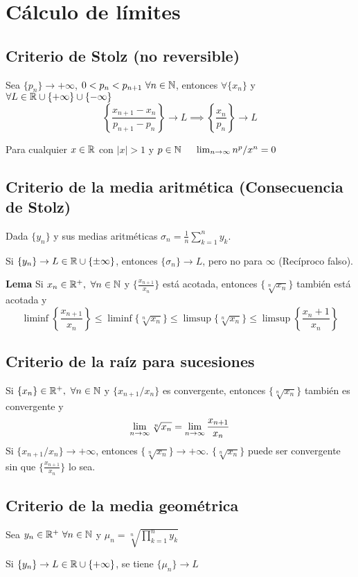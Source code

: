 \section{Cálculo de límites}
\subsection{Criterio de Stolz (no reversible)}
Sea $\{p_n\}\rightarrow +\infty$, $0<p_n<p_{n+1} \ \forall n\in\mathbb{N}$, entonces $\forall\{x_n\}$ y $\forall L\in\mathbb{R}\cup \{+\infty\}\cup\{-\infty\}$
$$ \left\{ \frac{x_{n+1}-x_n}{p_{n+1}-p_n} \right\} \rightarrow L \implies \left\{\frac{x_n}{p_n}\right\} \rightarrow L$$

Para cualquier $x\in\mathbb{R}$ con $|x|>1$ y $p\in\mathbb{N}\hspace{0.5cm} \lim_{\substack{n\rightarrow\infty}} n^p/x^n = 0 $

\subsection{Criterio de la media aritmética (Consecuencia de Stolz)}

Dada $\{y_n\}$ y sus medias aritméticas $\sigma_n = \frac{1}{n}\sum_{k=1}^n y_k $. 

Si $\{y_n\}\rightarrow L\in\mathbb{R}\cup\{\pm\infty\}$, entonces $\{\sigma_n\}\rightarrow L$, pero no para $\infty$ (Recíproco falso).

\textbf{Lema}
Si $x_n\in\R^+, \ \forall n\in\N$ y $\{\frac{x_{n+1}}{x_n}\}$ está acotada, entonces $\{\sqrt[n]{x_n}\}$ también está acotada y 
$$ \liminf \left\{\frac{x_{n+1}}{x_n}\right\} \leq
   \liminf \{\sqrt[n]{x_n}\} \leq \limsup \{\sqrt[n]{x_n}\}
   \leq \limsup \left\{\frac{x_n+1}{x_n}\right\}
$$
\subsection{Criterio de la raíz para sucesiones}
Si $\{x_n\} \in\mathbb{R}^+, \ \forall n\in\mathbb{N}$ y $\{x_{n+1}/x_n\}$ es convergente, entonces $\{\sqrt[n]{x_n}\}$ también es convergente y 
$$ \lim_{\substack{n\rightarrow\infty}} \sqrt[n]{x_n} = \lim_{\substack{n\rightarrow\infty}} \frac{x_{n+1}}{x_n} $$
Si $\{x_{n+1}/x_n\} \rightarrow +\infty$, entonces $\{\sqrt[n]{x_n}\} \rightarrow +\infty$. 
$\{\sqrt[n]{x_n}\}$ puede ser convergente sin que $\{\frac{x_{n+1}}{x_n }\}$ lo sea.

\subsection{Criterio de la media geométrica}
Sea $y_n \in\mathbb{R}^+ \ \forall n\in\mathbb{N}$ y 
$\mu_n = \sqrt[n]{ \prod_{k=1}^{n} y_k}$

Si $\{y_n\} \rightarrow L\in\mathbb{R}\cup \{+\infty\}$, se tiene $\{\mu_n\} \rightarrow L$